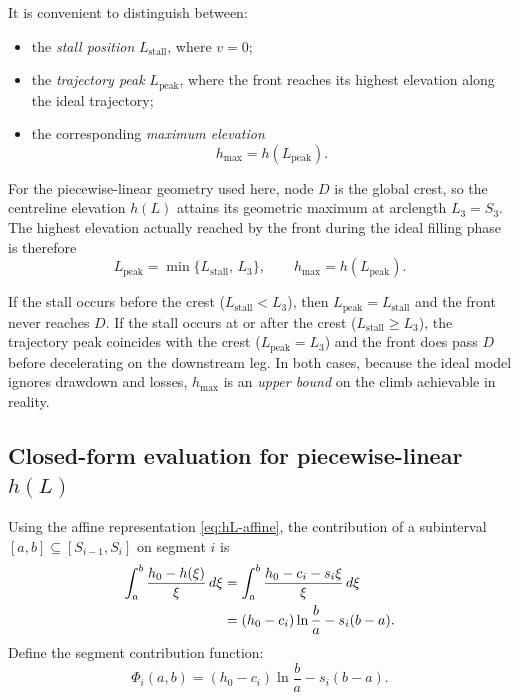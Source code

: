 \documentclass[11pt]{article}
\theoremstyle{definition}
\begin{document}
It is convenient to distinguish between:
\begin{itemize}[nosep]
  \item the \emph{stall position} $L_{\text{stall}}$, where $v = 0$;
  \item the \emph{trajectory peak} $L_{\text{peak}}$, where the front reaches its highest
        elevation along the ideal trajectory;
  \item the corresponding \emph{maximum elevation}
        \begin{equation}
          h_{\max} = h(L_{\text{peak}}).
        \end{equation}
\end{itemize}

For the piecewise-linear geometry used here, node $D$ is the global crest, so the centreline 
elevation $h(L)$ attains its geometric maximum at arclength $L_3 = S_3$. The highest elevation
actually reached by the front during the ideal filling phase is therefore
\begin{equation}
  L_{\text{peak}} = \min\{L_{\text{stall}},\,L_3\}, 
  \qquad
  h_{\max} = h(L_{\text{peak}}).
  \label{eq:hmax}
\end{equation}

If the stall occurs before the crest ($L_{\text{stall}} < L_3$), then $L_{\text{peak}} = 
L_{\text{stall}}$ and the front never reaches $D$. If the stall occurs at or after the crest 
($L_{\text{stall}} \ge L_3$), the trajectory peak coincides with the crest ($L_{\text{peak}} = 
L_3$) and the front does pass $D$ before decelerating on the downstream leg. In both cases, 
because the ideal model ignores drawdown and losses, $h_{\max}$ is an \emph{upper bound} on the 
climb achievable in reality.

\subsection{Closed-form evaluation for piecewise-linear $h(L)$}

Using the affine representation \eqref{eq:hL-affine}, the contribution of a subinterval 
$[a, b] \subseteq [S_{i-1}, S_i]$ on segment $i$ is
\begin{align}
  \int_a^b \frac{h_0 - h(\xi)}{\xi}\,d\xi 
  &= \int_a^b \frac{h_0 - c_i - s_i \xi}{\xi}\,d\xi \notag \\
  &= (h_0 - c_i) \ln\frac{b}{a} - s_i (b - a).
  \label{eq:segment-integral}
\end{align}
Define the segment contribution function:
\begin{equation}
  \Phi_i(a, b) = (h_0 - c_i) \ln\frac{b}{a} - s_i(b - a).
  \label{eq:Phi}
\end{equation}
\end{document}

